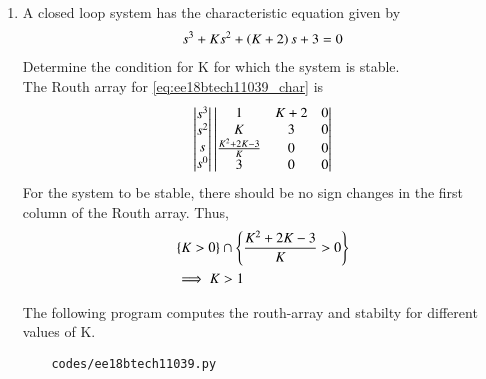 \begin{enumerate}[label=\thesubsection.\arabic*.,ref=\thesubsection.\theenumi]

\item A closed loop system has the characteristic equation given by 
\begin{align} 
s^3+Ks^2+\left(K+2\right)s+3 = 0 
\label{eq:ee18btech11039_char}
\end{align}
Determine the condition for K for which the system is stable.
\\
\solution The Routh array for \eqref{eq:ee18btech11039_char} is
%
\begin{align}
    \begin{vmatrix}s^3 \\ s^2 \\ s \\ s^0\end{vmatrix} 
    \begin{vmatrix}1 & K+2 & 0 \\ K & 3 & 0 \\ \frac{K^2+2K-3}{K} & 0 & 0 \\ 3 & 0 & 0\end{vmatrix}
\end{align}
%
For the system to be stable, there should be no sign changes in the first column of the Routh array. Thus,%
\begin{align}
  \left\{  K > 0\right\} &\cap \left\{\frac{K^2+2K-3}{K} > 0\right\} 
\\
\implies K &> 1
\end{align}

The following program computes the routh-array and stabilty for different values of K.
\begin{lstlisting}
    codes/ee18btech11039.py
\end{lstlisting}

\end{enumerate}

